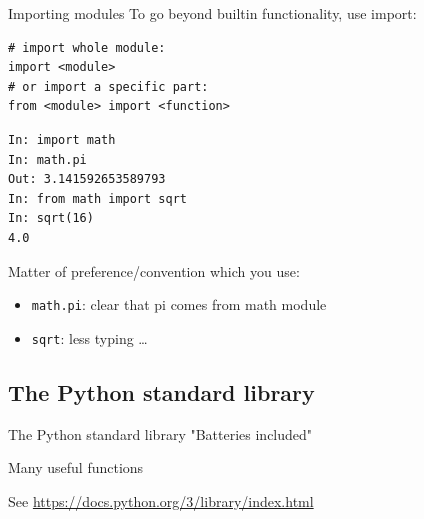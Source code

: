 \documentclass[aspectratio=169,usenames,dvipsnames]{beamer}
\begin{document}
\begin{frame}[fragile]{Importing modules}
To go beyond builtin functionality, use import:
\begin{lstlisting}
# import whole module:
import <module>
# or import a specific part:
from <module> import <function>
\end{lstlisting}

\pause
\begin{lstlisting}
In: import math
In: math.pi
Out: 3.141592653589793
In: from math import sqrt
In: sqrt(16)
4.0
\end{lstlisting}

Matter of preference/convention which you use:
\begin{itemize}
    \item \lstinline{math.pi}: clear that pi comes from math module
    \item \lstinline{sqrt}: less typing \dots
\end{itemize}
\end{frame}

\subsection{The Python standard library}
\begin{frame}[fragile]{The Python standard library}
	"Batteries included"

	\vspace{1em}
	Many useful functions

	\vspace{1em}
    See \url{https://docs.python.org/3/library/index.html}
\end{frame}
\end{document}
